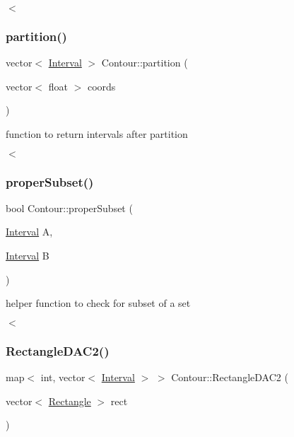 $<$ \mbox{\label{classContour_a897419a7c2395ef5a367a784e063454d}} 
\subsubsection{\texorpdfstring{partition()}{partition()}}
{\footnotesize\ttfamily vector$<$ \hyperlink{classInterval}{Interval} $>$ Contour\+::partition (\begin{DoxyParamCaption}\item[{vector$<$ float $>$}]{coords }\end{DoxyParamCaption})}



function to return intervals after partition 

$<$ \mbox{\label{classContour_a96e3306fd29f86f54fd49c095a0a9bff}} 
\subsubsection{\texorpdfstring{proper\+Subset()}{properSubset()}}
{\footnotesize\ttfamily bool Contour\+::proper\+Subset (\begin{DoxyParamCaption}\item[{\hyperlink{classInterval}{Interval}}]{A,  }\item[{\hyperlink{classInterval}{Interval}}]{B }\end{DoxyParamCaption})}



helper function to check for subset of a set 

$<$ \mbox{\label{classContour_a12d302a8ebc036b8f85e75b3f19e85df}} 
\subsubsection{\texorpdfstring{Rectangle\+D\+A\+C2()}{RectangleDAC2()}}
{\footnotesize\ttfamily map$<$ int, vector$<$ \hyperlink{classInterval}{Interval} $>$ $>$ Contour\+::\+Rectangle\+D\+A\+C2 (\begin{DoxyParamCaption}\item[{vector$<$ \hyperlink{classRectangle}{Rectangle} $>$}]{rect }\end{DoxyParamCaption})}



